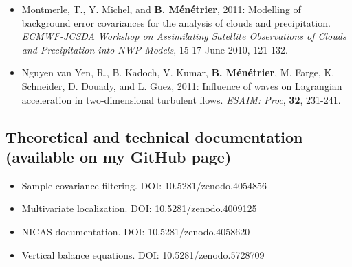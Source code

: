 \documentclass[a4paper,9pt]{scrreprt}
\begin{document}
\begin{itemize}
\item Montmerle, T.,  Y. Michel, and \textbf{B. Ménétrier}, 2011: Modelling of background error covariances for the analysis of clouds and precipitation. \textit{ECMWF-JCSDA Workshop on Assimilating Satellite Observations of Clouds and Precipitation into NWP Models}, 15-17 June 2010, 121-132.\vspace{-0.1cm}
\item Nguyen van Yen, R., B. Kadoch, V. Kumar, \textbf{B. Ménétrier}, M. Farge, K. Schneider, D. Douady, and L. Guez, 2011: Influence of waves on Lagrangian acceleration in two-dimensional turbulent flows. \textit{ESAIM: Proc}, \textbf{32}, 231-241.
\end{itemize}

\subsection*{Theoretical and technical documentation (available on my GitHub page)}
\begin{itemize}
\item Sample covariance filtering. DOI: 10.5281/zenodo.4054856
\item Multivariate localization. DOI: 10.5281/zenodo.4009125
\item NICAS documentation. DOI: 10.5281/zenodo.4058620
\item Vertical balance equations. DOI: 10.5281/zenodo.5728709
\end{itemize}
\end{document}
